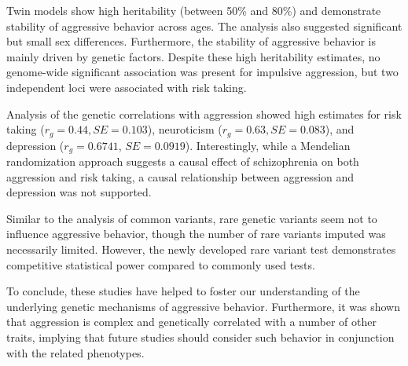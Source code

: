 \documentclass[header.tex]{subfiles}
\begin{document}
Twin models show high heritability (between 50\% and 80\%) and demonstrate stability of aggressive behavior across ages.
The analysis also suggested significant but small sex differences.
Furthermore, the stability of aggressive behavior is mainly driven by genetic factors.
Despite these high heritability estimates, no genome-wide significant association was present for impulsive aggression, but two independent loci were associated with risk taking.

Analysis of the genetic correlations with aggression showed high estimates for risk taking ($r_g=0.44, SE=0.103$), neuroticism ($r_g=0.63, SE=0.083$), and depression ($r_g=0.6741$, $SE=0.0919$).
Interestingly, while a Mendelian randomization approach suggests a causal effect of schizophrenia on both aggression and risk taking, a causal relationship between aggression and depression was not supported.

Similar to the analysis of common variants, rare genetic variants seem not to influence aggressive behavior, though the number of rare variants imputed was necessarily limited.
However, the newly developed rare variant test demonstrates competitive statistical power compared to commonly used tests.

To conclude, these studies have helped to foster our understanding of the underlying genetic mechanisms of aggressive behavior.
Furthermore, it was shown that aggression is complex and genetically correlated with a number of other traits,
implying that future studies should consider  such behavior in conjunction with the related phenotypes.     
\end{document}
